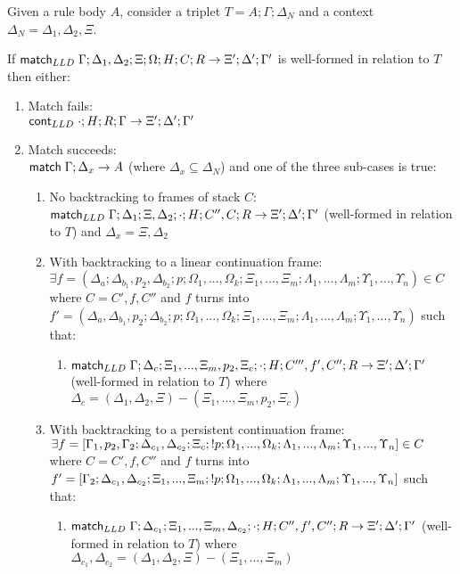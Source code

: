 \begin{lemma}\label{thm:body_match}
   
Given a rule body $A$, consider a triplet $T = A; \Gamma; \Delta_{N}$ and a context $\Delta_{N} = \Delta_1, \Delta_2, \Xi$.

If $\mathsf{match}_{LLD} \; \Gamma; \Delta_1, \Delta_2; \Xi; \Omega; H; C; R \rightarrow \Xi'; \Delta'; \Gamma'$ is well-formed in relation to $T$ then either:

\begin{enumerate}
   \item Match fails: \\ $\mathsf{cont}_{LLD} \; \cdot; H; R; \Gamma \rightarrow \Xi'; \Delta'; \Gamma'$
   \item Match succeeds: \\
      $\mathsf{match} \; \Gamma; \Delta_x \rightarrow A$ (where $\Delta_x \subseteq \Delta_N$) and one of the three sub-cases is true:
      \begin{enumerate}
         \item No backtracking to frames of stack $C$: \\ $\mathsf{match}_{LLD} \; \Gamma; \Delta_1; \Xi, \Delta_2; \cdot; H; C'', C; R \rightarrow \Xi'; \Delta'; \Gamma'$ (well-formed in relation to $T$) and $\Delta_x = \Xi, \Delta_2$
         \item With backtracking to a linear continuation frame: \\ $\exists f = (\Delta_a; \Delta_{b_1}, p_2, \Delta_{b_2}; p; \Omega_1, ..., \Omega_k; \Xi_1, ..., \Xi_m; \Lambda_1, ..., \Lambda_m; \Upsilon_1, ..., \Upsilon_n) \in C$ where $C = C', f, C''$ and $f$ turns into $f' = (\Delta_a, \Delta_{b_1}, p_2; \Delta_{b_2}; p; \Omega_1, ..., \Omega_k; \Xi_1, ..., \Xi_m; \Lambda_1, ..., \Lambda_m; \Upsilon_1, ..., \Upsilon_n)$ such that:
         \begin{enumerate}
            \item $\mathsf{match}_{LLD} \; \Gamma; \Delta_c; \Xi_1, ..., \Xi_m, p_2, \Xi_c; \cdot; H; C''', f', C''; R \rightarrow \Xi'; \Delta'; \Gamma'$ (well-formed in relation to $T$) where $\Delta_c = (\Delta_1, \Delta_2, \Xi) - (\Xi_1, ..., \Xi_m, p_2, \Xi_c)$
         \end{enumerate}
         \item With backtracking to a persistent continuation frame: \\$\exists f = [\Gamma_1, p_2, \Gamma_2; \Delta_{c_1}, \Delta_{c_2}; \Xi_c; {!} p; \Omega_1, ..., \Omega_k; \Lambda_1, ..., \Lambda_m; \Upsilon_1, ..., \Upsilon_n] \in C$ where $C = C', f, C''$ and $f$ turns into $f' = [\Gamma_2; \Delta_{c_1}, \Delta_{c_2}; \Xi_1, ..., \Xi_m; {!} p; \Omega_1, ..., \Omega_k; \Lambda_1, ..., \Lambda_m; \Upsilon_1, ..., \Upsilon_n]$ such that:
         \begin{enumerate}
            \item $\mathsf{match}_{LLD} \; \Gamma; \Delta_{c_1}; \Xi_1, ..., \Xi_m, \Delta_{c_2}; \cdot; H; C'', f', C''; R \rightarrow \Xi'; \Delta'; \Gamma'$ (well-formed in relation to $T$) where $\Delta_{c_1}, \Delta_{c_2} = (\Delta_1, \Delta_2, \Xi) - (\Xi_1, ..., \Xi_m)$
         \end{enumerate}
      \end{enumerate}
\end{enumerate}


\end{lemma}
